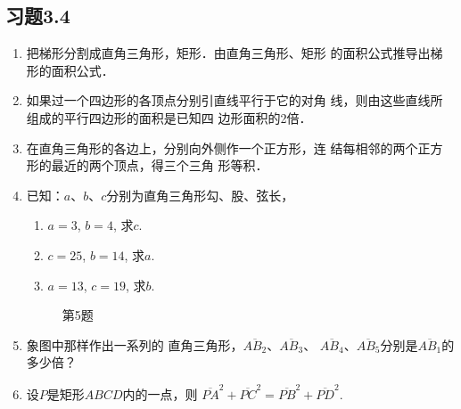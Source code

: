 \subsection*{习题3.4}
\begin{enumerate}
    \item 把梯形分割成直角三角形，矩形．由直角三角形、矩形
    的面积公式推导出梯形的面积公式．
    \item 如果过一个四边形的各顶点分别引直线平行于它的对角
    线，则由这些直线所组成的平行四边形的面积是已知四
    边形面积的2倍．
    \item 在直角三角形的各边上，分别向外侧作一个正方形，连
    结每相邻的两个正方形的最近的两个顶点，得三个三角
    形等积．
    \item 已知：$a$、$b$、$c$分别为直角三角形勾、股、弦长，
    \begin{enumerate}
        \item $a=3$, $b=4$, 求$c$.
        \item $c=25$, $b=14$, 求$a$.
     \item $a=13$, $c=19$, 求$b$.
    \end{enumerate}

    \begin{figure}[htp]
    \centering
{}    
    \caption*{第5题}
\end{figure}

\item 象图中那样作出一系列的
直角三角形，$\overline{AB_2}$、$\overline{AB_3}$、
$\overline{AB_4}$、$\overline{AB_5}$分别是$\overline{AB_1}$的
多少倍？
\item 设$P$是矩形$ABCD$内的一点，则
$\overline{PA}^2+\overline{PC}^2=\overline{PB}^2+\overline{PD}^2$.


\end{enumerate}
